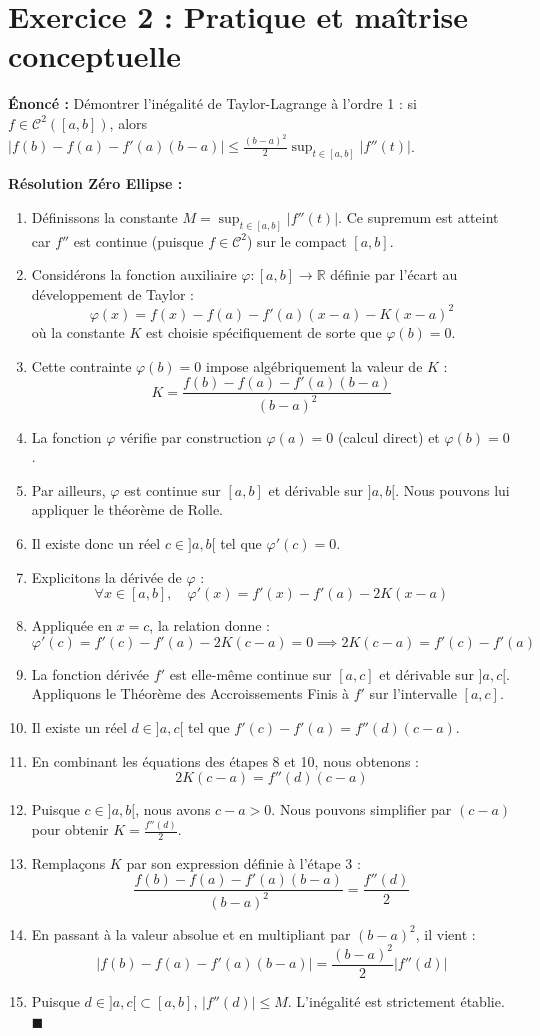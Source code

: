 \documentclass[11pt,a4paper]{article}
\begin{document}
\vspace{1em}

\section*{Exercice 2 : Pratique et maîtrise conceptuelle}

\textbf{Énoncé :}
Démontrer l'inégalité de Taylor-Lagrange à l'ordre 1 : si $f \in \mathcal{C}^2([a,b])$, alors $|f(b) - f(a) - f'(a)(b-a)| \leq \frac{(b-a)^2}{2} \sup_{t \in [a,b]} |f''(t)|$.

\textbf{Résolution Zéro Ellipse :}
\begin{enumerate}
\item Définissons la constante $M = \sup_{t \in [a,b]} |f''(t)|$. Ce supremum est atteint car $f''$ est continue (puisque $f \in \mathcal{C}^2$) sur le compact $[a,b]$.
\item Considérons la fonction auxiliaire $\varphi : [a,b] \to \mathbb{R}$ définie par l'écart au développement de Taylor :
   \[  \varphi(x) = f(x) - f(a) - f'(a)(x-a) - K(x-a)^2  \]
   où la constante $K$ est choisie spécifiquement de sorte que $\varphi(b) = 0$.
\item Cette contrainte $\varphi(b) = 0$ impose algébriquement la valeur de $K$ :
   \[  K = \frac{f(b) - f(a) - f'(a)(b-a)}{(b-a)^2}  \]
\item La fonction $\varphi$ vérifie par construction $\varphi(a) = 0$ (calcul direct) et $\varphi(b) = 0$.
\item Par ailleurs, $\varphi$ est continue sur $[a,b]$ et dérivable sur $]a,b[$. Nous pouvons lui appliquer le théorème de Rolle.
\item Il existe donc un réel $c \in ]a,b[$ tel que $\varphi'(c) = 0$.
\item Explicitons la dérivée de $\varphi$ :
   \[  \forall x \in [a,b], \quad \varphi'(x) = f'(x) - f'(a) - 2K(x-a)  \]
\item Appliquée en $x=c$, la relation donne :
   \[  \varphi'(c) = f'(c) - f'(a) - 2K(c-a) = 0 \implies 2K(c-a) = f'(c) - f'(a)  \]
\item La fonction dérivée $f'$ est elle-même continue sur $[a,c]$ et dérivable sur $]a,c[$. Appliquons le Théorème des Accroissements Finis à $f'$ sur l'intervalle $[a,c]$.
\item Il existe un réel $d \in ]a,c[$ tel que $f'(c) - f'(a) = f''(d)(c-a)$.
\item En combinant les équations des étapes 8 et 10, nous obtenons :
    \[  2K(c-a) = f''(d)(c-a)  \]
\item Puisque $c \in ]a,b[$, nous avons $c - a > 0$. Nous pouvons simplifier par $(c-a)$ pour obtenir $K = \frac{f''(d)}{2}$.
\item Remplaçons $K$ par son expression définie à l'étape 3 :
    \[  \frac{f(b) - f(a) - f'(a)(b-a)}{(b-a)^2} = \frac{f''(d)}{2}  \]
\item En passant à la valeur absolue et en multipliant par $(b-a)^2$, il vient :
    \[  |f(b) - f(a) - f'(a)(b-a)| = \frac{(b-a)^2}{2} |f''(d)|  \]
\item Puisque $d \in ]a,c[ \subset [a,b]$, $|f''(d)| \leq M$. L'inégalité est strictement établie. $\blacksquare$
\end{enumerate}
\end{document}
